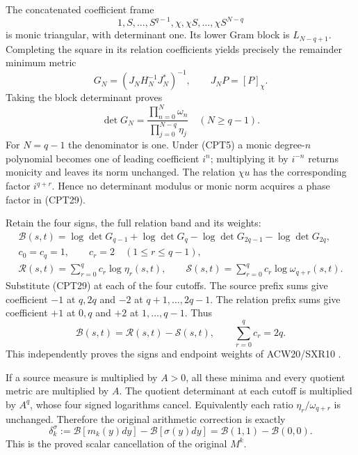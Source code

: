 \documentclass[11pt]{article}
\newcommand{\Bcal}{\mathcal B}
\newcommand{\Rcal}{\mathcal R}
\newcommand{\Scal}{\mathcal S}
\begin{document}
The concatenated coefficient frame
\[
 1,S,\ldots,S^{q-1},\chi,\chi S,\ldots,\chi S^{N-q}
\]
is monic triangular, with determinant one.
Its lower Gram block is \(L_{N-q+1}\).  Completing the square
in its relation coefficients yields precisely the remainder
minimum metric
\[
 G_N=(J_NH_N^{-1}J_N^*)^{-1},\qquad
 J_NP=[P]_\chi.
\]
Taking the block determinant proves
\begin{equation}\tag{CPT29}
 \det G_N=
 \frac{\prod_{n=0}^N\omega_n}
      {\prod_{j=0}^{N-q}\eta_j}\quad(N\ge q-1).
\end{equation}
For \(N=q-1\) the denominator is one.
Under (CPT5) a monic degree-\(n\) polynomial becomes one of
leading coefficient \(i^n\); multiplying it by \(i^{-n}\)
returns monicity and leaves its norm unchanged.  The relation
\(\chi u\) has the corresponding factor \(i^{q+r}\).
Hence no determinant modulus or monic norm acquires a phase
factor in (CPT29).

Retain the four signs, the full relation band and its weights:
\begin{equation}\tag{CPT30}
\begin{gathered}
 \Bcal(s,t)=\log\det G_{q-1}+\log\det G_q
             -\log\det G_{2q-1}-\log\det G_{2q},\\
 c_0=c_q=1,\qquad c_r=2\quad(1\le r\le q-1),\\
 \Rcal(s,t)=\sum_{r=0}^q c_r\log\eta_r(s,t),\qquad
 \Scal(s,t)=\sum_{r=0}^q c_r\log\omega_{q+r}(s,t).
\end{gathered}
\end{equation}
Substitute (CPT29) at each of the four cutoffs.
The source prefix sums give coefficient \(-1\) at \(q,2q\)
and \(-2\) at \(q+1,\ldots,2q-1\).
The relation prefix sums give coefficient \(+1\) at \(0,q\)
and \(+2\) at \(1,\ldots,q-1\).  Thus
\begin{equation}\tag{CPT31}
 \boxed{\Bcal(s,t)=\Rcal(s,t)-\Scal(s,t),\qquad
 \sum_{r=0}^q c_r=2q.}
\end{equation}
This independently proves the signs and endpoint weights of
ACW20/SXR10 \cite{centralProvider,sourceRelation}.

If a source measure is multiplied by \(A>0\), all these minima
and every quotient metric are multiplied by \(A\).
The quotient determinant at each cutoff is multiplied by
\(A^q\), whose four signed logarithms cancel.
Equivalently each ratio \(\eta_r/\omega_{q+r}\) is unchanged.
Therefore the original arithmetic correction is exactly
\begin{equation}\tag{CPT32}
 \delta_k^\sigma
 :=\Bcal[m_k(y)dy]-\Bcal[\sigma(y)dy]
 =\Bcal(1,1)-\Bcal(0,0).
\end{equation}
This is the proved scalar cancellation of the original \(M^k\).
\end{document}
